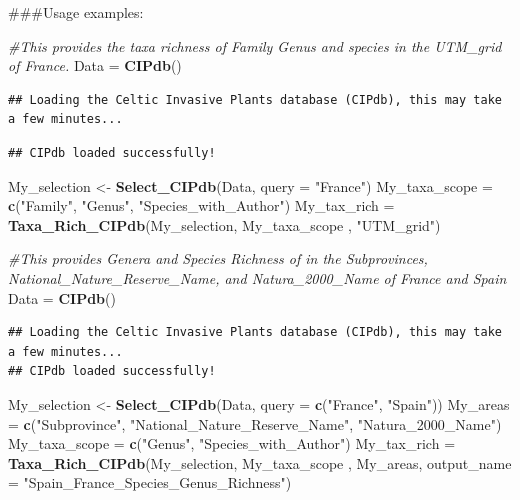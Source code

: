 \documentclass[
]{article}
\newenvironment{Shaded}{\begin{snugshade}}{\end{snugshade}}
\newcommand{\AttributeTok}[1]{\textcolor[rgb]{0.13,0.29,0.53}{#1}}
\newcommand{\CommentTok}[1]{\textcolor[rgb]{0.56,0.35,0.01}{\textit{#1}}}
\newcommand{\FunctionTok}[1]{\textcolor[rgb]{0.13,0.29,0.53}{\textbf{#1}}}
\newcommand{\NormalTok}[1]{#1}
\newcommand{\OtherTok}[1]{\textcolor[rgb]{0.56,0.35,0.01}{#1}}
\newcommand{\StringTok}[1]{\textcolor[rgb]{0.31,0.60,0.02}{#1}}
\begin{document}
\#\#\#Usage examples:

\begin{Shaded}
\begin{Highlighting}[]
\CommentTok{\#This provides the taxa richness of Family Genus and species in the UTM\_grid of France.}
\NormalTok{Data }\OtherTok{=} \FunctionTok{CIPdb}\NormalTok{()}
\end{Highlighting}
\end{Shaded}

\begin{verbatim}
## Loading the Celtic Invasive Plants database (CIPdb), this may take a few minutes...
\end{verbatim}

\begin{verbatim}
## CIPdb loaded successfully!
\end{verbatim}

\begin{Shaded}
\begin{Highlighting}[]
\NormalTok{My\_selection }\OtherTok{\textless{}{-}} \FunctionTok{Select\_CIPdb}\NormalTok{(Data, }\AttributeTok{query =} \StringTok{"France"}\NormalTok{)}
\NormalTok{My\_taxa\_scope }\OtherTok{=} \FunctionTok{c}\NormalTok{(}\StringTok{"Family"}\NormalTok{, }\StringTok{"Genus"}\NormalTok{, }\StringTok{"Species\_with\_Author"}\NormalTok{)}
\NormalTok{My\_tax\_rich }\OtherTok{=} \FunctionTok{Taxa\_Rich\_CIPdb}\NormalTok{(My\_selection, My\_taxa\_scope , }\StringTok{"UTM\_grid"}\NormalTok{)}

\CommentTok{\#This provides Genera and Species Richness of  in the Subprovinces, National\_Nature\_Reserve\_Name, and Natura\_2000\_Name  of France  and Spain}
\NormalTok{Data }\OtherTok{=} \FunctionTok{CIPdb}\NormalTok{()}
\end{Highlighting}
\end{Shaded}

\begin{verbatim}
## Loading the Celtic Invasive Plants database (CIPdb), this may take a few minutes...
## CIPdb loaded successfully!
\end{verbatim}

\begin{Shaded}
\begin{Highlighting}[]
\NormalTok{My\_selection }\OtherTok{\textless{}{-}} \FunctionTok{Select\_CIPdb}\NormalTok{(Data, }\AttributeTok{query =} \FunctionTok{c}\NormalTok{(}\StringTok{"France"}\NormalTok{, }\StringTok{"Spain"}\NormalTok{))}
\NormalTok{My\_areas  }\OtherTok{=} \FunctionTok{c}\NormalTok{(}\StringTok{"Subprovince"}\NormalTok{, }\StringTok{"National\_Nature\_Reserve\_Name"}\NormalTok{, }\StringTok{"Natura\_2000\_Name"}\NormalTok{)}
\NormalTok{My\_taxa\_scope }\OtherTok{=} \FunctionTok{c}\NormalTok{(}\StringTok{"Genus"}\NormalTok{, }\StringTok{"Species\_with\_Author"}\NormalTok{)}
\NormalTok{My\_tax\_rich }\OtherTok{=} \FunctionTok{Taxa\_Rich\_CIPdb}\NormalTok{(My\_selection, My\_taxa\_scope , My\_areas, }\AttributeTok{output\_name =} \StringTok{"Spain\_France\_Species\_Genus\_Richness"}\NormalTok{)}
\end{Highlighting}
\end{Shaded}
\end{document}
